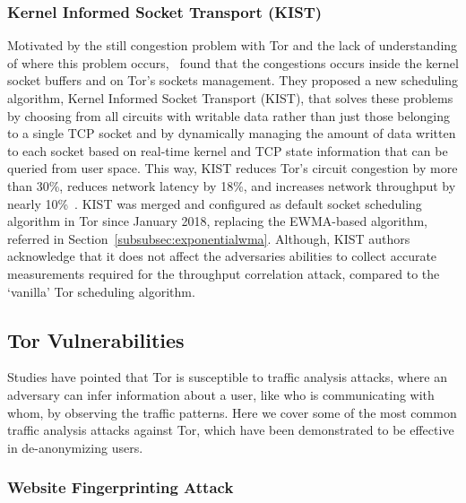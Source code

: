 \subsubsection{Kernel Informed Socket Transport (KIST)}\label{subsubsec:kist}

Motivated by the still congestion problem with Tor and the lack of understanding of where this problem occurs,~\citeauthor{KIST} found that the congestions occurs inside the kernel socket buffers and on Tor's sockets management. They proposed a new scheduling algorithm, Kernel Informed Socket Transport (KIST), that solves these problems by choosing from all circuits with writable data rather than just those belonging to a single TCP socket and by dynamically managing the amount of data written to each socket based on real-time kernel and TCP state information that can be queried from user space. This way, KIST reduces Tor's circuit congestion by more than 30\%, reduces network latency by 18\%, and increases network throughput by nearly 10\%~\cite{KIST}. 
KIST was merged and configured as default socket scheduling algorithm in Tor since January 2018, replacing the EWMA-based algorithm, referred in Section~\ref{subsubsec:exponentialwma}. Although, KIST authors acknowledge that it does not affect the adversaries abilities to collect accurate measurements required for the throughput correlation attack, compared to the `vanilla' Tor scheduling algorithm.

\subsection{Tor Vulnerabilities}\label{subsec:tor_vulnerabilities}

Studies have pointed that Tor is susceptible to traffic analysis attacks, where an adversary can infer information about a user, like who is communicating with whom, by observing the traffic patterns. Here we cover some of the most common traffic analysis attacks against Tor, which have been demonstrated to be effective in de-anonymizing users.

\subsubsection{Website Fingerprinting Attack}\label{subsubsec:website_fingerprinting_attack}

